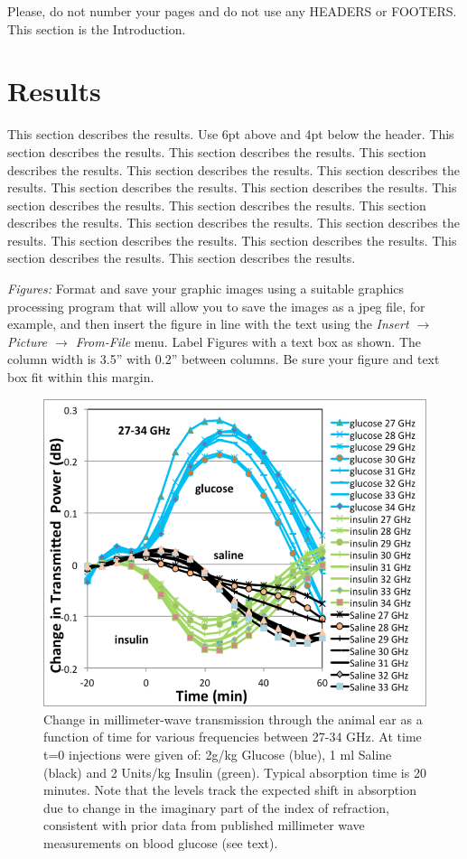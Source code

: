 \documentclass{irmmwthzconf}
\begin{document}
Please, do not number your pages and do not use any HEADERS or FOOTERS. This section is the Introduction.

\section{Results}

This section describes the results. Use 6pt above and 4pt below the header. This section describes the results. This section describes the results. This section describes the results. This section describes the results. This section describes the results. This section describes the results. This section describes the results. This section describes the results. This section describes the results. This section describes the results. This section describes the results. This section describes the results. This section describes the results. This section describes the results. This section describes the results. This section describes the results.

\textit{Figures:} Format and save your graphic images using a suitable graphics processing program that will allow you to save the images as a jpeg file, for example, and then insert the figure in line with the text using the \textit{Insert $\rightarrow$ Picture $\rightarrow$ From-File} menu. Label Figures with a text box as shown. The column width is 3.5'' with 0.2'' between columns. Be sure your figure and text box fit within this margin.

\begin{figure}[h!]
  \centering
  \includegraphics[width=\columnwidth]{transmission.png}
  \caption{Change in millimeter-wave transmission through the animal ear as a
    function of time for various frequencies between 27-34 GHz. At time t=0
    injections were given of: 2g/kg Glucose (blue), 1 ml Saline (black) and 2
    Units/kg Insulin (green). Typical absorption time is 20 minutes. Note that
    the levels track the expected shift in absorption due to change in the
    imaginary part of the index of refraction, consistent with prior data
    from published millimeter wave measurements on blood glucose (see text).}
  \label{fig:transmission}
\end{figure}
\end{document}
